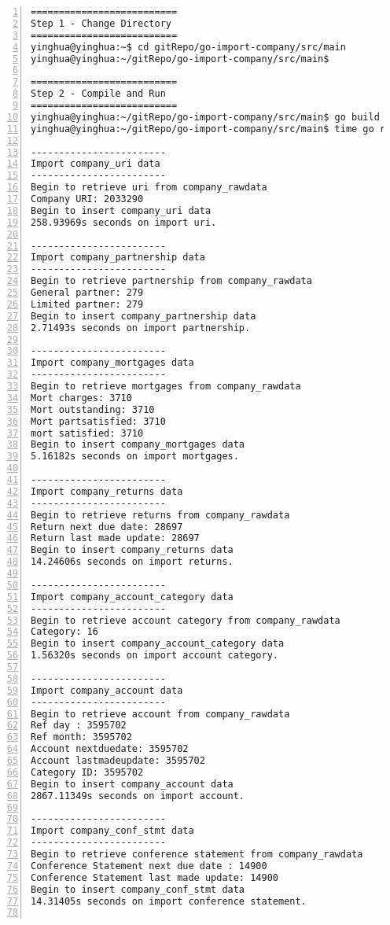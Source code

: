 \lstset{basicstyle=\ttfamily\tiny}  
\begin{lstlisting}[breaklines, frame=single, numbers=left, caption={Execution of Company Migration Program.}, label=commandline-02]
==========================
Step 1 - Change Directory
==========================
yinghua@yinghua:~$ cd gitRepo/go-import-company/src/main
yinghua@yinghua:~/gitRepo/go-import-company/src/main$

==========================
Step 2 - Compile and Run 
==========================
yinghua@yinghua:~/gitRepo/go-import-company/src/main$ go build *.go 
yinghua@yinghua:~/gitRepo/go-import-company/src/main$ time go run *.go 

------------------------
Import company_uri data 
------------------------
Begin to retrieve uri from company_rawdata
Company URI: 2033290 
Begin to insert company_uri data
258.93969s seconds on import uri. 

------------------------
Import company_partnership data 
------------------------
Begin to retrieve partnership from company_rawdata
General partner: 279 
Limited partner: 279 
Begin to insert company_partnership data
2.71493s seconds on import partnership. 

------------------------
Import company_mortgages data 
------------------------
Begin to retrieve mortgages from company_rawdata
Mort charges: 3710 
Mort outstanding: 3710 
Mort partsatisfied: 3710 
mort satisfied: 3710 
Begin to insert company_mortgages data
5.16182s seconds on import mortgages. 

------------------------
Import company_returns data 
------------------------
Begin to retrieve returns from company_rawdata
Return next due date: 28697 
Return last made update: 28697 
Begin to insert company_returns data
14.24606s seconds on import returns. 

------------------------
Import company_account_category data 
------------------------
Begin to retrieve account category from company_rawdata
Category: 16 
Begin to insert company_account_category data
1.56320s seconds on import account category. 

------------------------
Import company_account data 
------------------------
Begin to retrieve account from company_rawdata
Ref day : 3595702 
Ref month: 3595702 
Account nextduedate: 3595702 
Account lastmadeupdate: 3595702 
Category ID: 3595702 
Begin to insert company_account data
2867.11349s seconds on import account.  

------------------------
Import company_conf_stmt data 
------------------------
Begin to retrieve conference statement from company_rawdata
Conference Statement next due date : 14900 
Conference Statement last made update: 14900 
Begin to insert company_conf_stmt data
14.31405s seconds on import conference statement. 


\end{lstlisting}
